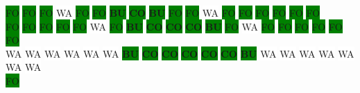 \colorbox{green}{\color[gray]{0.75}FO}%
\colorbox{green}{\color[gray]{0.75}FO}%
\colorbox{green}{\color[gray]{0.75}FO}%
\colorbox{white}{\color[gray]{0.5}WA}%
\colorbox{green}{\color[gray]{0.75}FO}%
\colorbox{green}{\color[gray]{0.75}FO}%
\colorbox{green}{\color[rgb]{1,0,0}\textbf{BU}}%
\colorbox{green}{\color[rgb]{0,0,0}\textbf{CO}}%
\colorbox{green}{\color[rgb]{1,0,0}\textbf{BU}}%
\colorbox{green}{\color[gray]{0.75}FO}%
\colorbox{green}{\color[gray]{0.75}FO}%
\colorbox{white}{\color[gray]{0.5}WA}%
\colorbox{green}{\color[gray]{0.75}FO}%
\colorbox{green}{\color[gray]{0.75}FO}%
\colorbox{green}{\color[gray]{0.75}FO}%
\colorbox{green}{\color[gray]{0.75}FO}%
\colorbox{green}{\color[gray]{0.75}FO}%
\colorbox{green}{\color[gray]{0.75}FO}%
\\
\colorbox{green}{\color[gray]{0.75}FO}%
\colorbox{green}{\color[gray]{0.75}FO}%
\colorbox{green}{\color[gray]{0.75}FO}%
\colorbox{green}{\color[gray]{0.75}FO}%
\colorbox{green}{\color[gray]{0.75}FO}%
\colorbox{white}{\color[gray]{0.5}WA}%
\colorbox{green}{\color[gray]{0.75}FO}%
\colorbox{green}{\color[rgb]{1,0,0}\textbf{BU}}%
\colorbox{green}{\color[rgb]{0,0,0}\textbf{CO}}%
\colorbox{green}{\color[rgb]{0,0,0}\textbf{CO}}%
\colorbox{green}{\color[rgb]{0,0,0}\textbf{CO}}%
\colorbox{green}{\color[rgb]{1,0,0}\textbf{BU}}%
\colorbox{green}{\color[gray]{0.75}FO}%
\colorbox{white}{\color[gray]{0.5}WA}%
\colorbox{green}{\color[gray]{0.75}FO}%
\colorbox{green}{\color[gray]{0.75}FO}%
\colorbox{green}{\color[gray]{0.75}FO}%
\colorbox{green}{\color[gray]{0.75}FO}%
\colorbox{green}{\color[gray]{0.75}FO}%
\colorbox{green}{\color[gray]{0.75}FO}%
\\
\colorbox{white}{\color[gray]{0.5}WA}%
\colorbox{white}{\color[gray]{0.5}WA}%
\colorbox{white}{\color[gray]{0.5}WA}%
\colorbox{white}{\color[gray]{0.5}WA}%
\colorbox{white}{\color[gray]{0.5}WA}%
\colorbox{white}{\color[gray]{0.5}WA}%
\colorbox{green}{\color[rgb]{1,0,0}\textbf{BU}}%
\colorbox{green}{\color[rgb]{0,0,0}\textbf{CO}}%
\colorbox{green}{\color[rgb]{0,0,0}\textbf{CO}}%
\colorbox{green}{\color[rgb]{0,0,0}\textbf{CO}}%
\colorbox{green}{\color[rgb]{0,0,0}\textbf{CO}}%
\colorbox{green}{\color[rgb]{0,0,0}\textbf{CO}}%
\colorbox{green}{\color[rgb]{1,0,0}\textbf{BU}}%
\colorbox{white}{\color[gray]{0.5}WA}%
\colorbox{white}{\color[gray]{0.5}WA}%
\colorbox{white}{\color[gray]{0.5}WA}%
\colorbox{white}{\color[gray]{0.5}WA}%
\colorbox{white}{\color[gray]{0.5}WA}%
\colorbox{white}{\color[gray]{0.5}WA}%
\colorbox{white}{\color[gray]{0.5}WA}%
\\
\colorbox{green}{\color[gray]{0.75}FO}%
